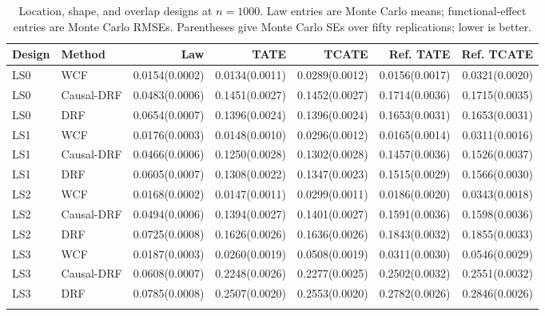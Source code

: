 \begin{table}[t]
\centering
\scriptsize
\setlength{\tabcolsep}{4pt}
\caption{Location, shape, and overlap designs at $n=1000$. Law entries are Monte Carlo means; functional-effect entries are Monte Carlo RMSEs. Parentheses give Monte Carlo SEs over fifty replications; lower is better.}
\label{tab:full_results_ls}
\begin{tabular}{llrrrrr}
\toprule
Design & Method & Law & TATE & TCATE & Ref. TATE & Ref. TCATE \\
\midrule
LS0 & WCF & 0.0154(0.0002) & 0.0134(0.0011) & 0.0289(0.0012) & 0.0156(0.0017) & 0.0321(0.0020) \\
LS0 & Causal-DRF & 0.0483(0.0006) & 0.1451(0.0027) & 0.1452(0.0027) & 0.1714(0.0036) & 0.1715(0.0035) \\
LS0 & DRF & 0.0654(0.0007) & 0.1396(0.0024) & 0.1396(0.0024) & 0.1653(0.0031) & 0.1653(0.0031) \\
\addlinespace
LS1 & WCF & 0.0176(0.0003) & 0.0148(0.0010) & 0.0296(0.0012) & 0.0165(0.0014) & 0.0311(0.0016) \\
LS1 & Causal-DRF & 0.0466(0.0006) & 0.1250(0.0028) & 0.1302(0.0028) & 0.1457(0.0036) & 0.1526(0.0037) \\
LS1 & DRF & 0.0605(0.0007) & 0.1308(0.0022) & 0.1347(0.0023) & 0.1515(0.0029) & 0.1566(0.0030) \\
\addlinespace
LS2 & WCF & 0.0168(0.0002) & 0.0147(0.0011) & 0.0299(0.0011) & 0.0186(0.0020) & 0.0343(0.0018) \\
LS2 & Causal-DRF & 0.0494(0.0006) & 0.1394(0.0027) & 0.1401(0.0027) & 0.1591(0.0036) & 0.1598(0.0036) \\
LS2 & DRF & 0.0725(0.0008) & 0.1626(0.0026) & 0.1636(0.0026) & 0.1843(0.0032) & 0.1855(0.0033) \\
\addlinespace
LS3 & WCF & 0.0187(0.0003) & 0.0260(0.0019) & 0.0508(0.0019) & 0.0311(0.0030) & 0.0546(0.0029) \\
LS3 & Causal-DRF & 0.0608(0.0007) & 0.2248(0.0026) & 0.2277(0.0025) & 0.2502(0.0032) & 0.2551(0.0032) \\
LS3 & DRF & 0.0785(0.0008) & 0.2507(0.0020) & 0.2553(0.0020) & 0.2782(0.0026) & 0.2846(0.0026) \\
\addlinespace
\bottomrule
\end{tabular}
\end{table}
